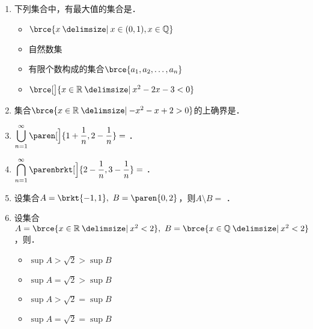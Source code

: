 \documentclass[a4paper,punct=CCT]{ctexbook}
\theoremstyle{definition}
\theoremstyle{remark}
\newif\ifshowsol
\begin{document}
\begin{enumerate}
\item 下列集合中，有最大值的集合是\uline{\makebox[4em]{}}．
  \begin{itemize}
    \renewcommand{\labelitemi}{\faCircleThin}
  \item \(\brce{x \mid x \in (0, 1), x \in \Q}\)
  \item 自然数集
    \ifshowsol
  \item[\faCircle] 有限个数构成的集合\(\brce{a_1, a_2, \dots, a_n}\)
    \else
  \item 有限个数构成的集合\(\brce{a_1, a_2, \dots, a_n}\)
    \fi
  \item \(\brce[\big]{x \in \R \mid x^2 - 2x -3 < 0}\)
  \end{itemize}

\item 集合\(\brce{x \in \R \mid -x^2 - x + 2 > 0}\)的上确界是\ifshowsol
  \uline{\makebox[4em]{\(1\)}}\else\uline{\makebox[4em]{}}\fi．

\item \(\displaystyle \bigcup_{n=1}^\infty \paren[\Big]{1 + \frac1n, 2 - \frac1n} =\)
  \ifshowsol\uline{\makebox[4em]{\((1, 2)\)}}\else\uline{\makebox[4em]{}}\fi．

\item \(\displaystyle \bigcap_{n=1}^\infty \parenbrkt[\Big]{2-\frac1n, 3-\frac1n} =\)
  \ifshowsol\uline{\makebox[4em]{\(\brce{2}\)}}\else\uline{\makebox[4em]{}}\fi．

\item 设集合\(A = \brkt{-1,1},\ B = \paren{0,2}\)，则\(A \setminus B =\)
  \ifshowsol\uline{\makebox[4em]{\(\brkt{-1,0}\)}}\else\uline{\makebox[4em]{}}\fi．

\item 设集合\(A = \brce{x \in \R \mid x^2 < 2},\ B = \brce{x \in \Q \mid x^2 < 2}\)，则\uline{\makebox[4em]{}}．
  \begin{itemize}
    \renewcommand{\labelitemi}{\faCircleThin}
  \item \(\sup A > \sqrt2 > \sup B\)
  \item \(\sup A = \sqrt2 > \sup B\)
  \item \(\sup A > \sqrt2 = \sup B\)
    \ifshowsol
  \item[\faCircle] \(\sup A = \sqrt2 = \sup B\)
    \else
  \item \(\sup A = \sqrt2 = \sup B\)
    \fi
  \end{itemize}


\end{enumerate}
\end{document}
